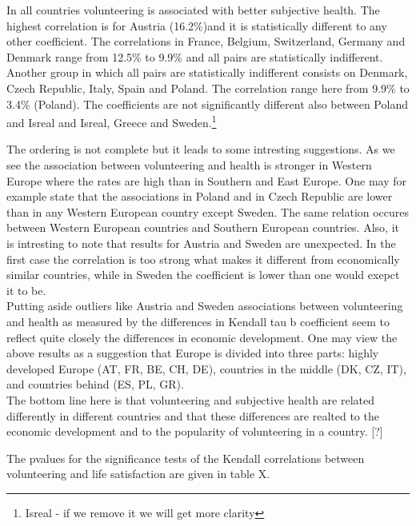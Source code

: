 \documentclass[10pt, letterpaper]{article}
\begin{document}
\begin{spacing}{1.4}
\begin{spacing}{.9}
	 
      \label{tauH} 
\end{spacing}

In all countries volunteering is associated with better subjective health. The highest correlation is for Austria (16.2\%)and it is statistically different to any other coefficient. The correlations in France, Belgium, Switzerland, Germany and Denmark range from 12.5\% to 9.9\% and all pairs are statistically indifferent. Another group in which all pairs are statistically indifferent consists on Denmark, Czech Republic, Italy, Spain and Poland. The correlation range here from 9.9\% to 3.4\% (Poland). The coefficients are not significantly different also between Poland and Isreal and Isreal, Greece and Sweden.\footnote{Isreal - if we remove it we will get more clarity} 

The ordering is not complete but it leads to some intresting suggestions. As we see the association between volunteering and health is stronger in Western Europe where the rates are high than in Southern and East Europe. One may for example state that the associations in Poland and in Czech Republic are lower than  in any Western European country except Sweden. The same relation occures between Western European countries and Southern European countries. Also, it is intresting to note that results for Austria and Sweden are unexpected. In the first case the correlation is too strong what makes it different from economically similar countries, while in Sweden the coefficient is lower than one would exepct it to be.  \\

Putting aside outliers like Austria and Sweden associations between volunteering and health as measured by the differences in Kendall tau b coefficient seem to reflect quite closely the differences in economic development.  One may view the above results as a suggestion that Europe is divided into three parts: highly developed Europe (AT, FR, BE, CH, DE), countries in the middle  (DK, CZ, IT), and countries behind (ES, PL, GR).  \\

The bottom line here is that volunteering and subjective health are related differently in different countries and that these differences are realted to the economic development and to the popularity of volunteering in a country. [?]

The pvalues for the significance tests of the Kendall correlations between volunteering and life satisfaction are given in table X.  \\



\end{spacing}
\end{document}
